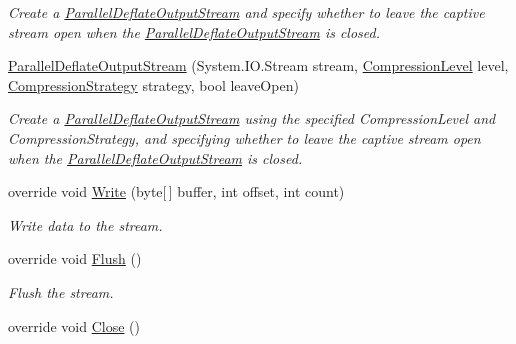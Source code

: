 \begin{DoxyCompactItemize}
\begin{DoxyCompactList}\small\item\em Create a \mbox{\hyperlink{class_super_tiled2_unity_1_1_ionic_1_1_zlib_1_1_parallel_deflate_output_stream}{Parallel\+Deflate\+Output\+Stream}} and specify whether to leave the captive stream open when the \mbox{\hyperlink{class_super_tiled2_unity_1_1_ionic_1_1_zlib_1_1_parallel_deflate_output_stream}{Parallel\+Deflate\+Output\+Stream}} is closed. \end{DoxyCompactList}\item 
\mbox{\hyperlink{class_super_tiled2_unity_1_1_ionic_1_1_zlib_1_1_parallel_deflate_output_stream_a98ff894e0bd5b9bed5c573dc67b4368f}{Parallel\+Deflate\+Output\+Stream}} (System.\+I\+O.\+Stream stream, \mbox{\hyperlink{namespace_super_tiled2_unity_1_1_ionic_1_1_zlib_a20f6771804996c363f454ad9765cd7db}{Compression\+Level}} level, \mbox{\hyperlink{namespace_super_tiled2_unity_1_1_ionic_1_1_zlib_abde5c10a1e2ee453e1e8e22e79a39a3b}{Compression\+Strategy}} strategy, bool leave\+Open)
\begin{DoxyCompactList}\small\item\em Create a \mbox{\hyperlink{class_super_tiled2_unity_1_1_ionic_1_1_zlib_1_1_parallel_deflate_output_stream}{Parallel\+Deflate\+Output\+Stream}} using the specified Compression\+Level and Compression\+Strategy, and specifying whether to leave the captive stream open when the \mbox{\hyperlink{class_super_tiled2_unity_1_1_ionic_1_1_zlib_1_1_parallel_deflate_output_stream}{Parallel\+Deflate\+Output\+Stream}} is closed. \end{DoxyCompactList}\item 
override void \mbox{\hyperlink{class_super_tiled2_unity_1_1_ionic_1_1_zlib_1_1_parallel_deflate_output_stream_a806d2664ad5782928882e0c1eab34616}{Write}} (byte\mbox{[}$\,$\mbox{]} buffer, int offset, int count)
\begin{DoxyCompactList}\small\item\em Write data to the stream. \end{DoxyCompactList}\item 
override void \mbox{\hyperlink{class_super_tiled2_unity_1_1_ionic_1_1_zlib_1_1_parallel_deflate_output_stream_a373174121f1b3d84bf9be9e338ba62a4}{Flush}} ()
\begin{DoxyCompactList}\small\item\em Flush the stream. \end{DoxyCompactList}\item 
override void \mbox{\hyperlink{class_super_tiled2_unity_1_1_ionic_1_1_zlib_1_1_parallel_deflate_output_stream_acb96b7dec375cba963d058ea1d344f64}{Close}} ()

\end{DoxyCompactItemize}
